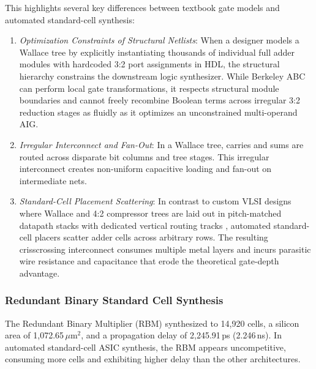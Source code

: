 This highlights several key differences between textbook gate models and automated standard-cell synthesis:
\begin{enumerate}
    \item \textit{Optimization Constraints of Structural Netlists}: When a designer models a Wallace tree by explicitly instantiating thousands of individual full adder modules with hardcoded 3:2 port assignments in HDL, the structural hierarchy constrains the downstream logic synthesizer. While Berkeley ABC can perform local gate transformations, it respects structural module boundaries and cannot freely recombine Boolean terms across irregular 3:2 reduction stages as fluidly as it optimizes an unconstrained multi-operand AIG.
    
    \item \textit{Irregular Interconnect and Fan-Out}: In a Wallace tree, carries and sums are routed across disparate bit columns and tree stages. This irregular interconnect creates non-uniform capacitive loading and fan-out on intermediate nets.
    
    \item \textit{Standard-Cell Placement Scattering}: In contrast to custom VLSI designs where Wallace and 4:2 compressor trees are laid out in pitch-matched datapath stacks with dedicated vertical routing tracks \cite{ohkubo1995, goto1997}, automated standard-cell placers scatter adder cells across arbitrary rows. The resulting crisscrossing interconnect consumes multiple metal layers and incurs parasitic wire resistance and capacitance that erode the theoretical gate-depth advantage.
\end{enumerate}

\subsubsection{Redundant Binary Standard Cell Synthesis}

The Redundant Binary Multiplier (RBM) synthesized to 14,920 cells, a silicon area of 1,072.65\,$\mu$m$^2$, and a propagation delay of 2,245.91\,ps (2.246\,ns). In automated standard-cell ASIC synthesis, the RBM appears uncompetitive, consuming more cells and exhibiting higher delay than the other architectures. 

